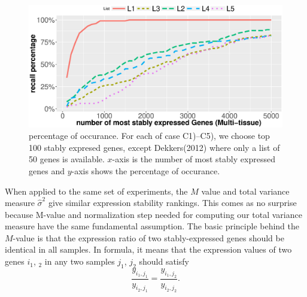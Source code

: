 \documentclass[11pt, a4paper]{article}
\begin{document}

 \begin{figure}[h!]
 	\begin{center}
 		\includegraphics[scale=0.5]{Figures/rankVSrank_RNA2.eps}
 		\caption{percentage of occurance. For each of case C1)--C5), we choose top 100 stably expresed genes, except Dekkers(2012) where only a list of 50 genes is available. $x$-axis is the number of most stably expressed genes and $y$-axis shows the percentage of occurance.}
	 	\label{fig:rankVSrank_RNA}
	 	\end{center}
 \end{figure}
When applied to the same set of experiments, the $M$ value and total variance
measure $\hat\sigma^2$ give similar expression stability rankings. 
This comes as no surprise because M-value and
normalization step needed for computing our total variance measure have the
same fundamental assumption. The basic principle
behind the $M$-value is that the expression ratio of two stably-expressed
genes should be identical in all samples. In formula, it means that the
expression values of two genes $i_1$, $_2$ in any two samples $j_1$, $j_2$
should satisfy
\begin{equation}\label{eq:typical}
   \dfrac{y_{i_1, j_1}}{y_{i_2, j_1}} = \dfrac{y_{i_1, j_2}}{y_{i_2, j_2}}.
\end{equation} 
\end{document}
